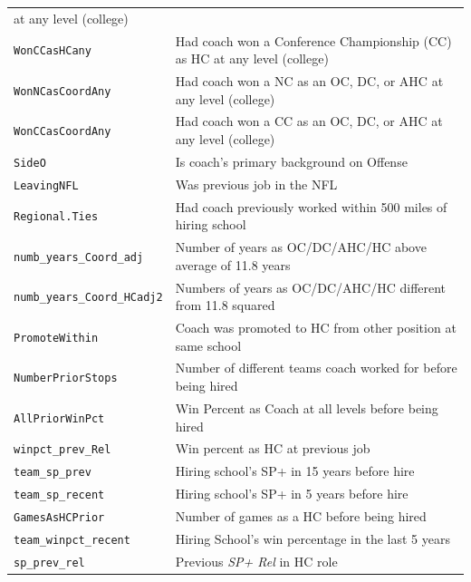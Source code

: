 \documentclass[
  12pt]{article}
\begin{document}
\begin{longtable}[]{@{}
  >{\raggedright\arraybackslash}p{}
  >{\raggedright\arraybackslash}p{}@{}}
at any level (college) \\
\texttt{WonCCasHCany} & Had coach won a Conference Championship (CC) as
HC at any level (college) \\
\texttt{WonNCasCoordAny} & Had coach won a NC as an OC, DC, or AHC at
any level (college) \\
\texttt{WonCCasCoordAny} & Had coach won a CC as an OC, DC, or AHC at
any level (college) \\
\texttt{SideO} & Is coach's primary background on Offense \\
\texttt{LeavingNFL} & Was previous job in the NFL \\
\texttt{Regional.Ties} & Had coach previously worked within 500 miles of
hiring school \\
\texttt{numb\_years\_Coord\_adj} & Number of years as OC/DC/AHC/HC above
average of 11.8 years \\
\texttt{numb\_years\_Coord\_HCadj2} & Numbers of years as OC/DC/AHC/HC
different from 11.8 squared \\
\texttt{PromoteWithin} & Coach was promoted to HC from other position at
same school \\
\texttt{NumberPriorStops} & Number of different teams coach worked for
before being hired \\
\texttt{AllPriorWinPct} & Win Percent as Coach at all levels before
being hired \\
\texttt{winpct\_prev\_Rel} & Win percent as HC at previous job \\
\texttt{team\_sp\_prev} & Hiring school's SP+ in 15 years before hire \\
\texttt{team\_sp\_recent} & Hiring school's SP+ in 5 years before
hire \\
\texttt{GamesAsHCPrior} & Number of games as a HC before being hired \\
\texttt{team\_winpct\_recent} & Hiring School's win percentage in the
last 5 years \\
\texttt{sp\_prev\_rel} & Previous \emph{SP+ Rel} in HC role \\
\end{longtable}
\end{document}
